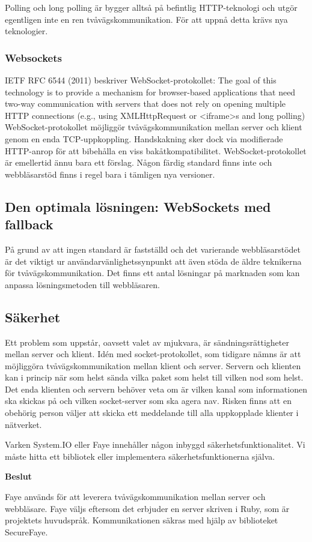 Polling och long polling är bygger alltså på befintlig HTTP-teknologi och utgör egentligen inte en ren tvåvägskommunikation. För att uppnå detta krävs nya teknologier.

\subsubsection{Websockets}
IETF RFC 6544 (2011) beskriver WebSocket-protokollet:
The goal of this technology is to provide a mechanism for browser-based applications that need two-way communication with servers that does not rely on opening multiple HTTP connections (e.g., using XMLHttpRequest or <iframe>s and long polling)
WebSocket-protokollet möjliggör tvåvägskommunikation mellan server och klient genom en enda TCP-uppkoppling. Handskakning sker dock via modifierade HTTP-anrop för att bibehålla en viss bakåtkompatibilitet.
WebSocket-protokollet är emellertid ännu bara ett förslag. Någon färdig standard finns inte och webbläsarstöd finns i regel bara i tämligen nya versioner.

\subsection{Den optimala lösningen: WebSockets med fallback}
På grund av att ingen standard är fastställd och det varierande webbläsarstödet är det viktigt ur användarvänlighetssynpunkt att även stöda de äldre teknikerna för tvåvägskommunikation.
Det finns ett antal lösningar på marknaden som kan anpassa lösningsmetoden till webbläsaren. 

\subsection{Säkerhet}
Ett problem som uppstår, oavsett valet av mjukvara, är sändningsrättigheter mellan server och klient. Idén med socket-protokollet, som tidigare nämns är att möjliggöra tvåvägskommunikation mellan klient och server. Servern och klienten kan i princip när som helst sända vilka paket som helst till vilken nod som helst. Det enda klienten och servern behöver veta om är vilken kanal som informationen ska skickas på och vilken socket-server som ska agera nav. Risken finns att en obehörig person väljer att skicka ett meddelande till alla uppkopplade klienter i nätverket.

Varken System.IO eller Faye innehåller någon inbyggd säkerhetsfunktionalitet. Vi måste hitta ett bibliotek eller implementera säkerhetsfunktionerna själva.

\begin{flushright}
  
  \textbf{Beslut}
  
  Faye används för att leverera tvåvägskommunikation mellan server och webbläsare. Faye väljs eftersom det erbjuder en server skriven i Ruby, som är projektets huvudspråk. Kommunikationen säkras med hjälp av biblioteket SecureFaye.
  
\end{flushright}